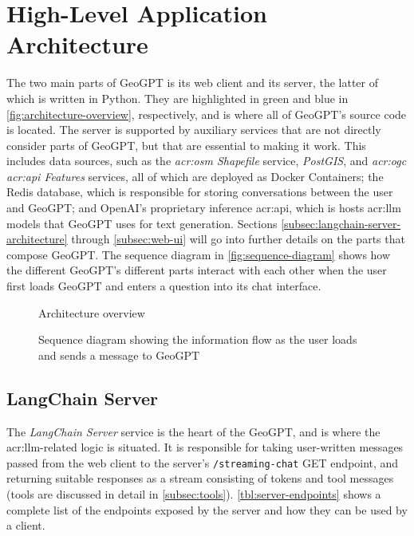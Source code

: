\section{High-Level Application Architecture}
\label{sec:high-level-application-architecture}

The two main parts of GeoGPT is its web client and its server, the latter of which is written in Python. They are highlighted in green and blue in \autoref{fig:architecture-overview}, respectively, and is where all of GeoGPT's source code is located. The server is supported by auxiliary services that are not directly consider parts of GeoGPT, but that are essential to making it work. This includes data sources, such as the \textit{\acrshort{acr:osm} Shapefile} service, \textit{PostGIS}, and \textit{\acrshort{acr:ogc} \acrshort{acr:api} Features} services, all of which are deployed as Docker Containers; the Redis database, which is responsible for storing conversations between the user and GeoGPT; and OpenAI's proprietary inference \acrshort{acr:api}, which is hosts \acrshort{acr:llm} models that GeoGPT uses for text generation. Sections \ref{subsec:langchain-server-architecture} through \ref{subsec:web-ui} will go into further details on the parts that compose GeoGPT. The sequence diagram in \autoref{fig:sequence-diagram} shows how the different GeoGPT's different parts interact with each other when the user first loads GeoGPT and enters a question into its chat interface.

\begin{figure}
    \centering
    \caption{Architecture overview}
    \label{fig:architecture-overview}
\end{figure}

\begin{figure}
    \caption{Sequence diagram showing the information flow as the user loads and sends a message to GeoGPT}
    \label{fig:sequence-diagram}
\end{figure}


\subsection{LangChain Server}\label{subsec:langchain-server}
\label{subsec:langchain-server-architecture}

The \textit{LangChain Server} service is the heart of the GeoGPT, and is where the \gls{acr:llm}-related logic is situated. It is responsible for taking user-written messages passed from the web client to the server's \texttt{/streaming-chat} GET endpoint, and returning suitable responses as a stream consisting of tokens and tool messages (tools are discussed in detail in \autoref{subsec:tools}). \autoref{tbl:server-endpoints} shows a complete list of the endpoints exposed by the server and how they can be used by a client.

